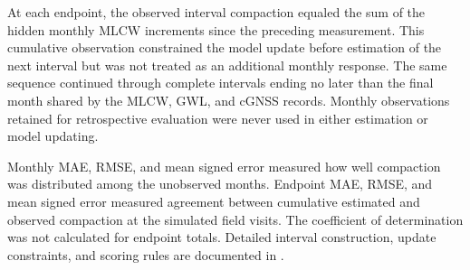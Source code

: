 At each endpoint, the observed interval compaction equaled the sum of the hidden monthly MLCW increments since the preceding measurement. This cumulative observation constrained the model update before estimation of the next interval but was not treated as an additional monthly response. The same sequence continued through complete intervals ending no later than the final month shared by the MLCW, GWL, and cGNSS records. Monthly observations retained for retrospective evaluation were never used in either estimation or model updating.

Monthly MAE, RMSE, and mean signed error measured how well compaction was distributed among the unobserved months. Endpoint MAE, RMSE, and mean signed error measured agreement between cumulative estimated and observed compaction at the simulated field visits. The coefficient of determination was not calculated for endpoint totals. Detailed interval construction, update constraints, and scoring rules are documented in .

\FloatBarrier
